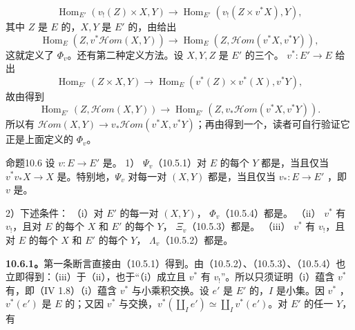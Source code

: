\[
\operatorname{Hom}_{E'}(v_!(Z)\times X,Y)\longrightarrow\operatorname{Hom}_{E'}(v_!(Z\times v^*X),Y),
\]
其中 $Z$ 是 $E$ 的，$X,Y$ 是 $E'$ 的，由给出
\[
\operatorname{Hom}_E(Z,v^*\mathscr{H}\!om(X,Y))\longrightarrow\operatorname{Hom}_E(Z,\mathscr{H}\!om(v^*X,v^*Y)),
\]
这就定义了 $\Phi_v$。还有第二种定义方法。设 $X,Y,Z$ 是 $E'$ 的三个。 $v^*:E'\to E$ 给出
\[
\operatorname{Hom}_{E'}(Z\times X,Y)\longrightarrow\operatorname{Hom}_E(v^*(Z)\times v^*(X),v^*Y),
\]
故由得到
\[
\operatorname{Hom}_{E'}(Z,\mathscr{H}\!om(X,Y))\longrightarrow\operatorname{Hom}_{E'}(Z,v_*\mathscr{H}\!om(v^*X,v^*Y)).
\]
所以有 $\mathscr{H}\!om(X,Y)\to v_*\mathscr{H}\!om(v^*X,v^*Y)$；再由得到一个，读者可自行验证它正是上面定义的 $\Phi_v$。
\begin{SGAresult}{命题}{10.6}
设 $v:E\to E'$ 是。
1） $\Psi_v$（10.5.1）对 $E$ 的每个 $Y$ 都是，当且仅当 $v^*v_*X\to X$ 是。特别地，$\Psi_v$ 对每一对 $(X,Y)$ 都是，当且仅当 $v_*:E\to E'$ ，即 $v$ 是。

2）下述条件：
（i）对 $E'$ 的每一对 $(X,Y)$， $\Phi_v$（10.5.4）都是。
（ii） $v^*$ 有 $v_!$，且对 $E$ 的每个 $X$ 和 $E'$ 的每个 $Y$， $\Xi_v$（10.5.3）都是。
（iii） $v^*$ 有 $v_!$，且对 $E$ 的每个 $X$ 和 $E'$ 的每个 $Y$， $\Lambda_v$（10.5.2）都是。
\end{SGAresult}
\textbf{10.6.1。}第一条断言直接由（10.5.1）得到。由（10.5.2）、（10.5.3）、（10.5.4）也立即得到：（iii）于（ii），也于“（i）成立且 $v^*$ 有 $v_!$”。所以只须证明（i）蕴含 $v^*$ 有，即（IV 1.8）（i）蕴含 $v^*$ 与小乘积交换。设 $e'$ 是 $E'$ 的，$I$ 是小集。因 $v^*$ ，$v^*(e')$ 是 $E$ 的；又因 $v^*$ 与交换，$v^*(\coprod_I e')\simeq\coprod_I v^*(e')$。对 $E'$ 的任一 $Y$，有
